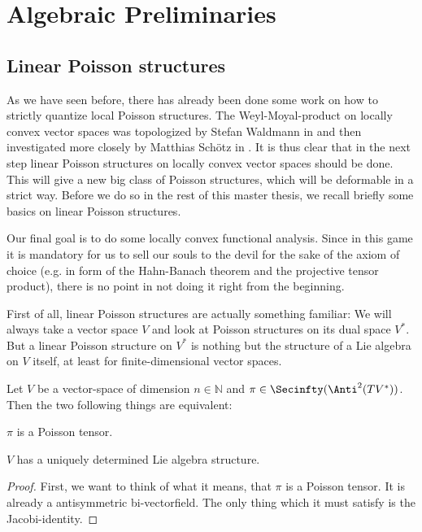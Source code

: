 
%
%

\chapter{Algebraic Preliminaries}


\section{Linear Poisson structures}
\label{sec:chap3_LinearPoisson}

As we have seen before, there has already been done some work on how to 
strictly quantize local Poisson structures. The Weyl-Moyal-product on locally 
convex vector spaces was topologized by Stefan Waldmann in 
\cite{Wladmann:2004:Nuclear} and then investigated more closely by Matthias 
Schötz in \cite{Schoetz:Master}. It is thus clear that in the next step linear 
Poisson structures on locally convex vector spaces should be done. This will 
give a new big class of Poisson structures, which will be deformable in a 
strict way. Before we do so in the rest of this master thesis, we recall 
briefly some basics on linear Poisson structures.
\begin{remark}
	Our final goal is to  do some locally convex functional analysis. Since in 
	this game it is mandatory for us to sell our souls to the devil for the 
	sake of the axiom of choice (e.g. in form of the Hahn-Banach theorem and 
	the projective tensor product), there is no point in not doing it right 
	from the beginning.
\end{remark}
First of all, linear Poisson structures are actually something familiar: 
We will always take a vector space $V$ and look at Poisson structures on its 
dual space $V^*$. But a linear Poisson structure on $V^*$ is nothing but the 
structure of a Lie algebra on $V$ itself, at least for finite-dimensional 
vector spaces.
\begin{proposition}
	\label{Prop:Alg:LinPoissonIsLieAlg}
	Let $V$ be a vector-space of dimension $n \in \mathbb{N}$ and $\pi \in 
	\Secinfty(\Anti^2(TV^*))$. Then the two following things are 
	equivalent:
	\begin{propositionlist}
		\item
		$\pi$ is a Poisson tensor.
		
		\item
		$V$ has a uniquely determined Lie algebra structure.
	\end{propositionlist}
\end{proposition}
\begin{proof}
	First, we want to think of what it means, that $\pi$ is a Poisson tensor. 
	It is already a antisymmetric bi-vectorfield. The only thing which it must 
	satisfy is the Jacobi-identity.
\end{proof}


